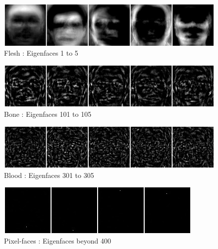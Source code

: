 \documentclass{article}
\begin{document}
\begin{figure}[h!]
	\centering
	\includegraphics[width=\textwidth]{images/eigfaces/face0-4}
	\caption{Flesh : Eigenfaces 1 to 5}
\end{figure}

\begin{figure}[h!]
	\centering
	\includegraphics[width=\textwidth]{images/eigfaces/face100-104}
	\caption{Bone : Eigenfaces 101 to 105}
\end{figure}

\begin{figure}[h!]
	\centering
	\includegraphics[width=\textwidth]{images/eigfaces/face300-304}
	\caption{Blood : Eigenfaces 301 to 305}
\end{figure}

\begin{figure}[h!]
	\centering
	\includegraphics[width=\textwidth]{images/eigfaces/facenoise}
	\caption{Pixel-faces : Eigenfaces beyond 400}
\end{figure}
\end{document}
